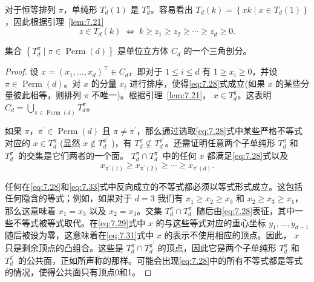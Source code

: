 对于恒等排列 \(\pi\)，单纯形 \({T}_{d}\left( 1\right)\) 是 \({T}_{d}^{\pi }\)。容易看出 \({T}_{d}\left( k\right)  = \left\{  {{xk} \mid  x \in  {T}_{d}\left( 1\right) }\right\}\)，因此根据引理~\ref{lem:7.21}
\begin{equation}
z \in  {T}_{d}\left( k\right) \; \Leftrightarrow  \;k \geq  {z}_{1} \geq  {z}_{2} \geq  \cdots  \geq  {z}_{d} \geq  0.\label{eq:7.32}
\end{equation}


\begin{lemma}\label{lem:7.22}
集合 \(\left\{  {{T}_{d}^{\pi } \mid  \pi  \in  \operatorname{Perm}\left( d\right) }\right\}\) 是单位立方体 \({C}_{d}\) 的一个三角剖分。
\end{lemma}

\begin{proof}
设 \(x = {\left( {x}_{1},\ldots,{x}_{d}\right) }^{\top } \in  {C}_{d}\)，即对于 \(1 \leq  i \leq  d\) 有 \(1 \geq  {x}_{i} \geq  0\)，并设 \(\pi  \in  \operatorname{Perm}\left( d\right)\)。对 \(x\) 的分量 \({x}_{i}\) 进行排序，使得\eqref{eq:7.28}式成立(如果 \(x\) 的某些分量彼此相等，则排列 \(\pi\) 不唯一)。根据引理~\ref{lem:7.21}， \(x \in  {T}_{d}^{\pi }\)。这表明 \({C}_{d} = \mathop{\bigcup }\limits_{{\pi  \in  \operatorname{Perm}\left( d\right) }}{T}_{d}^{\pi }\)。

如果 \(\pi，{\pi }^{\prime } \in  \operatorname{Perm}\left( d\right)\) 且 \(\pi  \neq  {\pi }^{\prime }\)，那么通过选取\eqref{eq:7.28}式中某些严格不等式对应的 \(x \in  {T}_{d}^{\pi }\) (显然 \(x \notin  {T}_{d}^{{\pi }^{\prime }}\) )，有 \({T}_{d}^{\pi } \nsubseteq  {T}_{d}^{{\pi }^{\prime }}\)。还需证明任意两个子单纯形 \({T}_{d}^{\pi }\) 和 \({T}_{d}^{{\pi }^{\prime }}\) 的交集是它们两者的一个面。 \({T}_{d}^{\pi } \cap  {T}_{d}^{{\pi }^{\prime }}\) 中的任何 \(x\) 都满足\eqref{eq:7.28}式以及
\begin{equation}
{x}_{{\pi }^{\prime }\left( 1\right) } \geq  {x}_{{\pi }^{\prime }\left( 2\right) } \geq  \cdots  \geq  {x}_{{\pi }^{\prime }\left( d\right) }.\label{eq:7.33}
\end{equation}

任何在\eqref{eq:7.28}和\eqref{eq:7.33}式中反向成立的不等式都必须以等式形式成立。这包括任何隐含的等式；例如，如果对于 \(d = 3\) 我们有 \({x}_{1} \geq  {x}_{2} \geq  {x}_{3}\) 和 \({x}_{2} \geq  {x}_{3} \geq  {x}_{1}\)，那么这意味着 \({x}_{1} = {x}_{3}\) 以及 \({x}_{2} = {x}_{3}\)。交集 \({T}_{d}^{\pi } \cap  {T}_{d}^{{\pi }^{\prime }}\) 随后由\eqref{eq:7.28}表征，其中一些不等式被等式取代。在\eqref{eq:7.29}式中 \(x\) 的与这些等式对应的重心坐标 \({y}_{1},\ldots,{y}_{d - 1}\) 随后被设为零，这意味着在\eqref{eq:7.31}式中 \(x\) 的表示不使用相应的顶点。因此， \(x\) 只是剩余顶点的凸组合。这些是 \({T}_{d}^{\pi } \cap  {T}_{d}^{{\pi }^{\prime }}\) 的顶点，因此它是两个子单纯形 \({T}_{d}^{\pi }\) 和 \({T}_{d}^{{\pi }^{\prime }}\) 的公共面，正如所声称的那样。可能会出现\eqref{eq:7.28}中的所有不等式都是等式的情况，使得公共面只有顶点0和1。
\end{proof}
\bigskip

